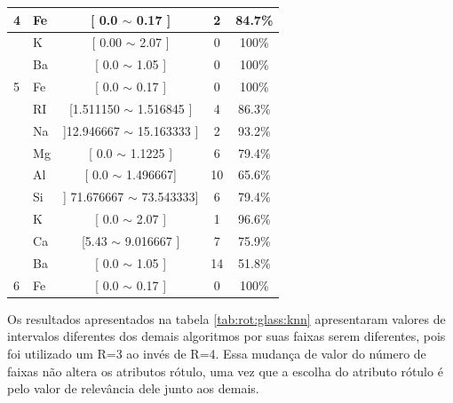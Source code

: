 \begin{table}[!ht]
{\begin{tabular}{llccc}
\multirow{-5}{*}{4}                          & Fe    & [ 0.0 $\sim$  0.17 ]    &  2  & 84.7\% \\  \hline                                            
                                            & K     & [ 0.00 $\sim$  2.07 ]     &  0 & 100\% \\ 
                                            & Ba     & [ 0.0 $\sim$  1.05 ]    &  0 & 100\% \\  
\multirow{-3}{*}{5}                         & Fe    & [ 0.0 $\sim$  0.17 ]     &  0 & 100\% \\  \hline
                                            & RI     & [1.511150 $\sim$  1.516845 ] &  4  & 86.3\% \\ 
                                            & Na     & ]12.946667 $\sim$  15.163333 ] &  2  & 93.2\% \\ 
                                             & Mg    & [ 0.0 $\sim$  1.1225 ]    & 6  & 79.4\%\\ 
                                             & Al    & [ 0.0 $\sim$  1.496667]      &  10  & 65.6\%\\
                                            & Si    & ] 71.676667 $\sim$  73.543333]      &  6  & 79.4\%\\
                                            & K     & [  0.0 $\sim$  2.07 ]    &  1  & 96.6\% \\ 
                                            & Ca     & [5.43 $\sim$ 9.016667 ]    &  7  & 75.9\% \\ 
                                            & Ba     & [ 0.0 $\sim$ 1.05 ]    &  14  & 51.8\% \\ 
\multirow{-9}{*}{6}                         & Fe    & [ 0.0 $\sim$  0.17 ]     &  0  & 100\% \\  \hline\hline

\end{tabular}
}
\end{table}


Os resultados apresentados na tabela \ref{tab:rot:glass:knn} apresentaram valores de intervalos diferentes dos demais algoritmos por suas faixas serem diferentes, pois foi utilizado um R=3 ao invés de R=4. Essa mudança de valor do número de faixas não altera os atributos rótulo, uma vez que a escolha do atributo rótulo é pelo valor de relevância dele junto aos demais. 


